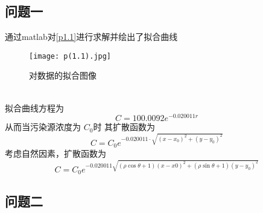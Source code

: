 \documentclass[UTF8]{ctexart}
\begin{document}
  \subsection{问题一} 
  通过matlab对\ref{p1.1}进行求解并绘出了拟合曲线\\
  \begin{figure}[htbp]
    \centering
    \texttt{[image: p(1.1).jpg]}
    \caption{对数据的拟合图像}
    \label{pp1.1}
  \end{figure}
 \\
  拟合曲线方程为
  $$C=100.0092 e^{-0.020011r}$$
从而当污染源浓度为 $C_0$时
其扩散函数为
\begin{equation}\label{p3.2.1}
 C=C_0 e^{-0.020011\cdot \sqrt{(x-x_0)^2+(y-y_0)^2}}
\end{equation}
 考虑自然因素，扩散函数为
\begin{equation}\label{p3.2.2}
  C=C_0 e^{-0.020011 \sqrt{(\rho\cos{\theta}+1)(x-x0)^2+(\rho\sin{\theta}+1)(y-y_0)^2}}
 \end{equation}

 
  \subsection{问题二}
  
\end{document}
